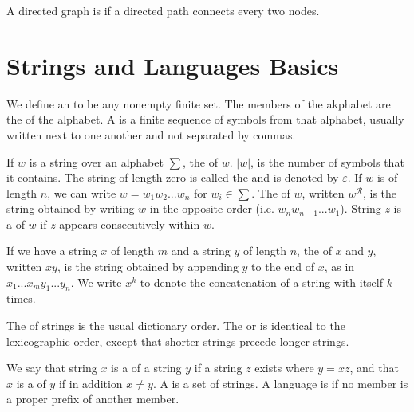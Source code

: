 \documentclass[12pt, a4paper, oneside, openright, titlepage]{book}
\begin{document}
\begin{appendices}
        \begin{defn}
            A directed graph is  if a directed path connects every two nodes.
        \end{defn}



        \section{Strings and Languages Basics}

        We define an  to be any nonempty finite set. The members of the akphabet are the  of the alphabet. A  is a finite sequence of symbols from that alphabet, usually written next to one another and not separated by commas. 

        If $w$ is a string over an alphabet $\sum$, the  of $w$. $|w|$, is the number of symbols that it contains. The string of length zero is called the  and is denoted by $\varepsilon$. If $w$ is of length $n$, we can write $w = w_1w_2...w_n$ for $w_i \in \sum$. The  of $w$, written $w^{\mathcal{R}}$, is the string obtained by writing $w$ in the opposite order (i.e. $w_nw_{n-1}...w_1$). String $z$ is a  of $w$ if $z$ appears consecutively within $w$.

        If we have a string $x$ of length $m$ and a string $y$ of length $n$, the  of $x$ and $y$, written $xy$, is the string obtained by appending $y$ to the end of $x$, as in $x_1...x_my_1...y_n$. We write $x^k$ to denote the concatenation of a string with itself $k$ times.


        The  of strings is the usual dictionary order. The  or  is identical to the lexicographic order, except that shorter strings precede longer strings.

        We say that string $x$ is a  of a string $y$ if a string $z$ exists where $y = xz$, and that $x$ is a  of $y$ if in addition $x \neq y$. A  is a set of strings. A language is  if no member is a proper prefix of another member.





\end{appendices}




\begin{appendices}


\end{appendices}
\end{document}
